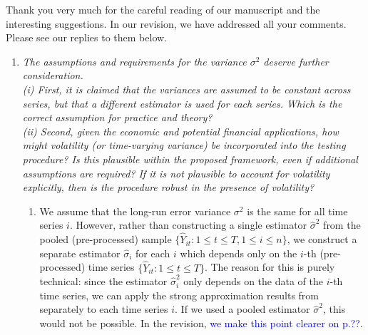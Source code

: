 \documentclass[a4paper,12pt]{article}
\begin{document}
Thank you very much for the careful reading of our manuscript and the interesting suggestions. In our revision, we have addressed all your comments. Please see our replies to them below.
\begin{enumerate}[label=\arabic*.,leftmargin=0.6cm]


\item \textit{The assumptions and requirements for the variance $\sigma^2$ deserve further consideration. \\
(i) First, it is claimed that the variances are assumed to be constant across series, but that a different estimator is used for each series. Which is the correct assumption for practice and theory? \\
(ii) Second, given the economic and potential financial applications, how might volatility (or time-varying variance) be incorporated into the testing procedure? Is this plausible within the proposed framework, even if additional assumptions are required? If it is not plausible to account for volatility explicitly, then is the procedure robust in the presence of volatility? }

\begin{enumerate}[label=(\roman*),leftmargin=0.75cm,topsep=0pt]

\item We assume that the long-run error variance $\sigma^2$ is the same for all time series $i$. However, rather than constructing a single estimator $\hat{\sigma}^2$ from the pooled (pre-processed) sample $\{ \widehat{Y}_{it}: 1 \le t \le T, 1 \le i \le n \}$, we construct a separate estimator $\hat{\sigma}_i$ for each $i$ which depends only on the $i$-th (pre-processed) time series $\{ \widehat{Y}_{it}: 1 \le t \le T\}$. The reason for this is purely technical: since the estimator $\hat{\sigma}_i^2$ only depends on the data of the $i$-th time series, we can apply the strong approximation results from \cite{BerkesLiuWu2014} separately to each time series $i$. If we used a pooled estimator $\hat{\sigma}^2$, this would not be possible. 
In the revision, \textcolor{blue}{we make this point clearer on p.??}.


\end{enumerate}
\end{enumerate}
\end{document}
